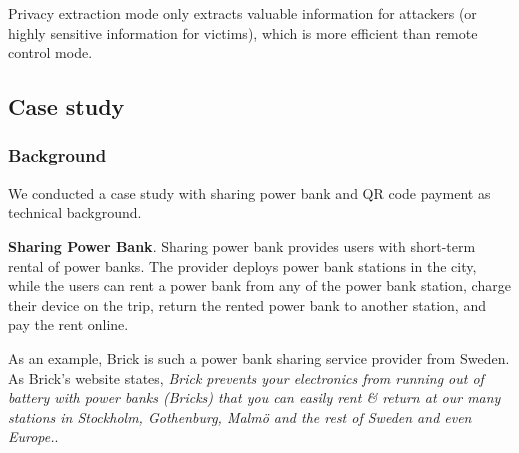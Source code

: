 Privacy extraction mode only extracts valuable information for attackers (or highly sensitive information for victims), which is more efficient  than remote control mode.



\subsection{Case study}

\subsubsection{Background}

We conducted a case study with sharing power bank and QR code payment as technical background.

\textbf{Sharing Power Bank}. 
Sharing power bank provides users with short-term rental of power banks. 
The provider deploys power bank stations in the city, while the users can rent a power bank from any of the power bank station, charge their device on the trip, return the rented power bank to another station, and pay the rent online.

As an example, Brick is such a power bank sharing service provider from Sweden. 
As Brick's website states, \textit{Brick prevents your electronics from running out of battery with power banks (Bricks) that you can easily rent \& return at our many stations in Stockholm, Gothenburg, Malmö and the rest of Sweden and even Europe.}. 

